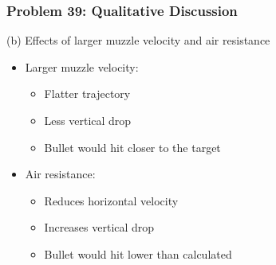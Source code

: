 \documentclass{beamer}
\begin{document}
\begin{frame}
\frametitle{Problem 39: Qualitative Discussion}
\begin{block}{(b) Effects of larger muzzle velocity and air resistance}
\begin{itemize}
    \item Larger muzzle velocity:
    \begin{itemize}
        \item Flatter trajectory
        \item Less vertical drop
        \item Bullet would hit closer to the target
    \end{itemize}
    \item Air resistance:
    \begin{itemize}
        \item Reduces horizontal velocity
        \item Increases vertical drop
        \item Bullet would hit lower than calculated
    \end{itemize}
\end{itemize}
\end{block}
\end{frame}
\end{document}
